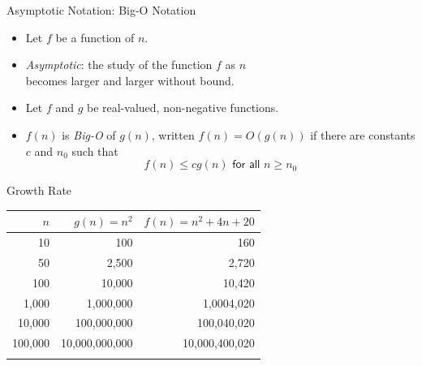 \documentclass[14pt,aspectratio=1610]{beamer}
\begin{document}
\begin{frame}{Asymptotic Notation: Big-O Notation}
\begin{itemize}
  \item
    Let \(f\) be a function of \(n\).
  \item
    \emph{Asymptotic}: the study of the function \(f\) as \(n\) \\
    becomes larger and larger without bound.
  \item
    Let \(f\) and \(g\) be real-valued, non-negative functions.
  \item
    \(f(n)\) is \emph{Big-O} of \(g(n)\), written \(f(n) = O(g(n))\) if there are constants \(c\) and \(n_0\) such that
     \begin{equation*}
      f(n) \le cg(n) \textsf{ for all } n \ge n_0
    \end{equation*}
\end{itemize}
\end{frame}

\begin{frame}{Growth Rate}
\begin{table}[]
{\rmfamily%
\begin{tabular}{rrr}
\toprule{}
  \(n\) & \(g(n) = n^2\) & \(f(n) = n^2 + 4n + 20\) \\
\midrule{}
     10  &            100 &            160\\
     50  &          2,500 &          2,720\\
    100  &         10,000 &         10,420\\
  1,000  &      1,000,000 &     1,0004,020\\
 10,000  &    100,000,000 &    100,040,020\\
100,000  & 10,000,000,000 & 10,000,400,020\\
\bottomrule{}
\end{tabular}%
}%
\end{table}
\end{frame}
\end{document}
